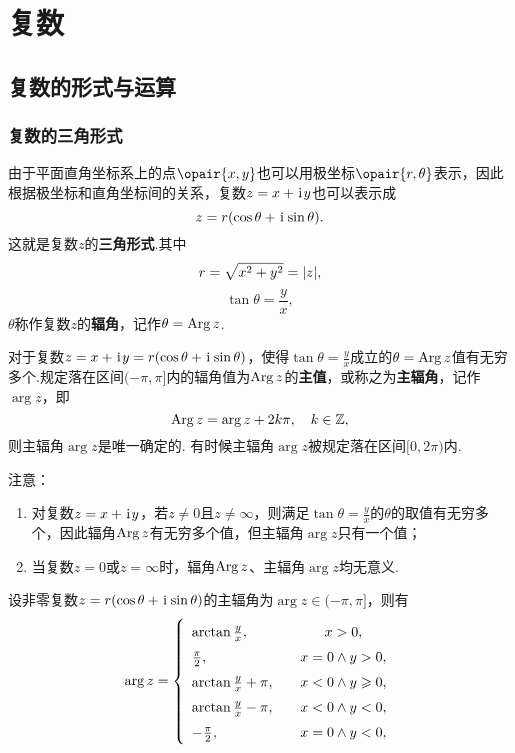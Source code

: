 \chapter{复数}
\section{复数的形式与运算}
\subsection{复数的三角形式}
\begin{definition}[复数的三角形式]
由于平面直角坐标系上的点\(\opair{x,y}\)也可以用极坐标\(\opair{r,\theta}\)表示，因此根据极坐标和直角坐标间的关系，复数\(z=x+\kern1pt\mathrm{i}\kern1pt y\)也可以表示成\[
z = r(\cos\theta+\kern1pt\mathrm{i}\kern1pt\sin\theta).
\]这就是复数\(z\)的\textbf{三角形式}.其中\[
r = \sqrt{x^2+y^2} = \abs{z},
\]\[
\tan\theta = \frac{y}{x},
\]\(\theta\)称作复数\(z\)的\textbf{辐角}，记作\(\theta = \operatorname{Arg}{z}\).

对于复数\(z=x+\kern1pt\mathrm{i}\kern1pt y=r(\cos\theta+\kern1pt\mathrm{i}\kern1pt\sin\theta)\)，使得\(\tan\theta=\frac{y}{x}\)成立的\(\theta=\operatorname{Arg}{z}\)值有无穷多个.规定落在区间\((-\pi,\pi]\)内的辐角值为\(\operatorname{Arg}{z}\)的\textbf{主值}，或称之为\textbf{主辐角}，记作\(\arg{z}\)，即\[
\operatorname{Arg}{z} = \arg{z} + 2k\pi, \quad k\in\mathbb{Z},
\]则主辐角\(\arg{z}\)是唯一确定的.
有时候主辐角\(\arg{z}\)被规定落在区间\([0,2\pi)\)内.

注意：\begin{enumerate}
\item 对复数\(z = x + \kern1pt\mathrm{i}\kern1pt y\)，若\(z \neq 0\)且\(z \neq \infty\)，则满足\(\tan \theta = \frac{y}{x}\)的\(\theta\)的取值有无穷多个，因此辐角\(\operatorname{Arg} z\)有无穷多个值，但主辐角\(\arg z\)只有一个值；
\item 当复数\(z = 0\)或\(z = \infty\)时，辐角\(\operatorname{Arg}{z}\)、主辐角\(\arg{z}\)均无意义.
\end{enumerate}
\end{definition}

\begin{theorem}
设非零复数\(z=r(\cos\theta+\kern1pt\mathrm{i}\kern1pt\sin\theta)\)的主辐角为\(\arg{z} \in (-\pi,\pi]\)，则有\[
\def\arraystretch{1.5}
\arg{z} = \left\{ \begin{array}{lc}
\arctan{\frac{y}{x}}, &\quad x > 0, \\
\frac{\pi}{2}, &\quad x = 0 \land y > 0, \\
\arctan{\frac{y}{x}} + \pi, &\quad x < 0 \land y \geqslant 0, \\
\arctan{\frac{y}{x}} - \pi, &\quad x < 0 \land y < 0, \\
-\frac{\pi}{2}, &\quad x = 0 \land y < 0,
\end{array} \right.
\]
\end{theorem}

